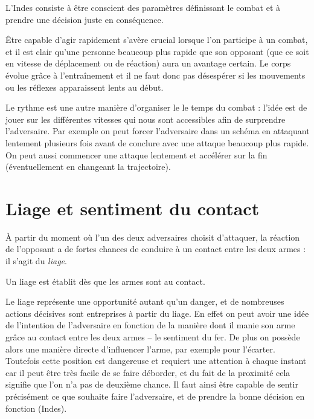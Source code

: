\begin{definition}

	L'Indes consiste à être conscient des paramètres définissant le combat et à prendre une décision juste en conséquence.
\end{definition}


Être capable d'agir rapidement s'avère crucial lorsque l'on participe à un combat, et il est clair qu'une personne beaucoup plus rapide que son opposant (que ce soit en vitesse de déplacement ou de réaction) aura un avantage certain.
Le corps évolue grâce à l'entraînement et il ne faut donc pas désespérer si les mouvements ou les réflexes apparaissent lents au début.

Le rythme est une autre manière d'organiser le le temps du combat : l'idée est de jouer sur les différentes vitesses qui nous sont accessibles afin de surprendre l'adversaire.
Par exemple on peut forcer l'adversaire dans un schéma en attaquant lentement plusieurs fois avant de conclure avec une attaque beaucoup plus rapide.
On peut aussi commencer une attaque lentement et accélérer sur la fin (éventuellement en changeant la trajectoire).


\section{Liage et sentiment du contact}


À partir du moment où l'un des deux adversaires choisit d'attaquer, la réaction de l'opposant a de fortes chances de conduire à un contact entre les deux armes : il s'agit du \emph{liage}.


\begin{definition}[Liage]
	\label{conc:def:liage}

	Un liage est établit dès que les armes sont au contact.
\end{definition}


Le liage représente une opportunité autant qu'un danger, et de nombreuses actions décisives sont entreprises à partir du liage.
En effet on peut avoir une idée de l'intention de l'adversaire en fonction de la manière dont il manie son arme grâce au contact entre les deux armes -- le sentiment du fer.
De plus on possède alors une manière directe d'influencer l'arme, par exemple pour l'écarter.
Toutefois cette position est dangereuse et requiert une attention à chaque instant car il peut être très facile de se faire déborder, et du fait de la proximité cela signifie que l'on n'a pas de deuxième chance.
Il faut ainsi être capable de sentir précisément ce que souhaite faire l'adversaire, et de prendre la bonne décision en fonction (Indes).


